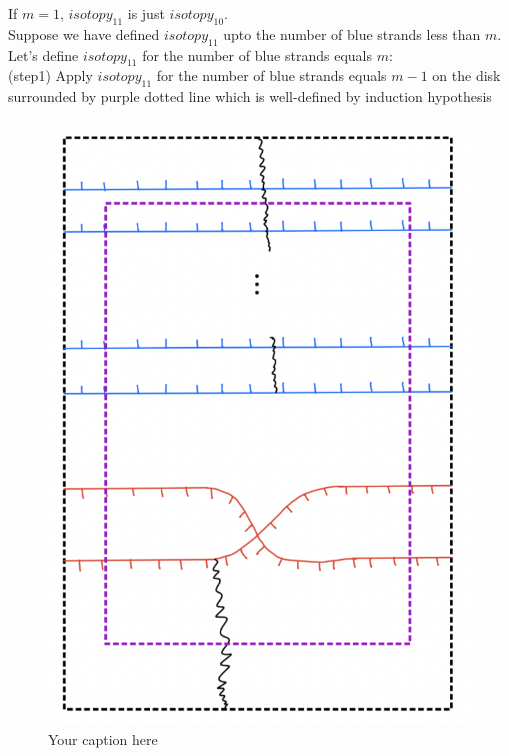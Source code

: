 If $m=1$, $isotopy_{11}$ is just $isotopy_{10}$.\\
Suppose we have defined $isotopy_{11}$ upto the number of blue strands less than $m$. Let's define $isotopy_{11}$ for the number of blue strands equals $m$:\\

(step1) Apply $isotopy_11$ for the number of blue strands equals $m-1$ on the disk surrounded by purple dotted line which is well-defined by induction hypothesis

\begin{figure}[H] %
    \centering
    \includegraphics[scale=0.95]{diagrams/lemma11/3.png} %
    \caption{Your caption here}
    \label{fig:your-label}
\end{figure}

